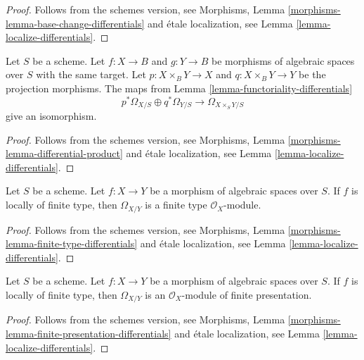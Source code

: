 \begin{proof}
Follows from the schemes version, see
Morphisms, Lemma \ref{morphisms-lemma-base-change-differentials}
and \'etale localization, see
Lemma \ref{lemma-localize-differentials}.
\end{proof}

\begin{lemma}
\label{lemma-differential-product}
Let $S$ be a scheme.
Let $f : X \to B$ and $g : Y \to B$ be morphisms of algebraic spaces
over $S$ with the same target.
Let $p : X \times_B Y \to X$ and $q : X \times_B Y \to Y$ be the
projection morphisms. The maps from
Lemma \ref{lemma-functoriality-differentials}
$$
p^*\Omega_{X/S} \oplus q^*\Omega_{Y/S}
\longrightarrow
\Omega_{X \times_S Y/S}
$$
give an isomorphism.
\end{lemma}

\begin{proof}
Follows from the schemes version, see
Morphisms, Lemma \ref{morphisms-lemma-differential-product}
and \'etale localization, see
Lemma \ref{lemma-localize-differentials}.
\end{proof}

\begin{lemma}
\label{lemma-finite-type-differentials}
Let $S$ be a scheme.
Let $f : X \to Y$ be a morphism of algebraic spaces over $S$.
If $f$ is locally of finite type, then $\Omega_{X/Y}$ is
a finite type $\mathcal{O}_X$-module.
\end{lemma}

\begin{proof}
Follows from the schemes version, see
Morphisms, Lemma \ref{morphisms-lemma-finite-type-differentials}
and \'etale localization, see
Lemma \ref{lemma-localize-differentials}.
\end{proof}

\begin{lemma}
\label{lemma-finite-presentation-differentials}
Let $S$ be a scheme.
Let $f : X \to Y$ be a morphism of algebraic spaces over $S$.
If $f$ is locally of finite type, then $\Omega_{X/Y}$ is
an $\mathcal{O}_X$-module of finite presentation.
\end{lemma}

\begin{proof}
Follows from the schemes version, see
Morphisms, Lemma \ref{morphisms-lemma-finite-presentation-differentials}
and \'etale localization, see
Lemma \ref{lemma-localize-differentials}.
\end{proof}














